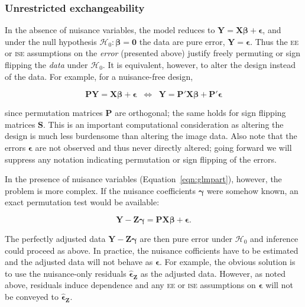 \subsubsection{Unrestricted exchangeability}
\label{sec:unrestricted}

In the absence of nuisance variables, the model reduces to $\mathbf{Y}=\mathbf{X}\boldsymbol{\beta}+\boldsymbol{\epsilon}$, and under the null hypothesis $\mathcal{H}_0:\boldsymbol{\beta}=\boldsymbol{0}$ the data are pure error, $\mathbf{Y}=\boldsymbol{\epsilon}$.  Thus the \textsc{ee} or \textsc{ise} assumptions on the \emph{error} (presented above) justify freely permuting or sign flipping the \emph{data} under $\mathcal{H}_0$.  It is equivalent, however, to alter the design instead of the data. For example, for a nuisance-free design,

\begin{equation}
\mathbf{P}\mathbf{Y}=\mathbf{X}\boldsymbol{\beta}+\boldsymbol{\epsilon}\;\;\Longleftrightarrow\;\;
\mathbf{Y}=\mathbf{P}'\mathbf{X}\boldsymbol{\beta}+\mathbf{P}'\boldsymbol{\epsilon}
\end{equation}

\noindent
since permutation matrices $\mathbf{P}$ are orthogonal; the same holds for sign flipping matrices $\mathbf{S}$. This is an important computational consideration as altering the design is much less burdensome than altering the image data. Also note that the errors $\boldsymbol{\epsilon}$ are not observed and thus never directly altered; going forward we will suppress any notation indicating permutation or sign flipping of the errors.

In the presence of nuisance variables (Equation~\ref{eqn:glmpart}), however, the problem is more complex. If the nuisance coefficients $\boldsymbol{\gamma}$ were somehow known, an exact permutation test would be available:

\begin{equation}
\mathbf{Y} - \mathbf{Z}\boldsymbol{\gamma} = \mathbf{P}\mathbf{X}\boldsymbol{\beta} + \boldsymbol{\epsilon}.
\end{equation}

The perfectly adjusted data $\mathbf{Y} - \mathbf{Z}\boldsymbol{\gamma}$ are then pure error under $\mathcal{H}_0$ and inference could proceed as above. In practice, the nuisance cofficients have to be estimated and the adjusted data will not behave as $\boldsymbol{\epsilon}$.  For example, the obvious solution is to use the nuisance-only residuals $\boldsymbol{\hat{\epsilon}}_{\mathbf{Z}}$ as the adjusted data.  However, as noted above, residuals induce dependence and any \textsc{ee} or \textsc{ise} assumptions on $\boldsymbol{\epsilon}$ will not be conveyed to $\boldsymbol{\hat{\epsilon}}_{\mathbf{Z}}$.

